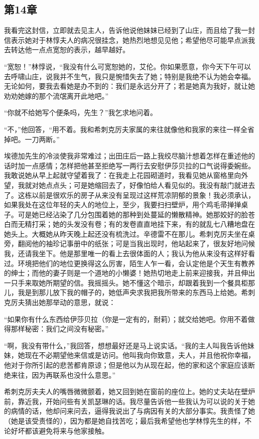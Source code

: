 \subsection{第14章}

\par 我看完这封信，立即就去见主人，告诉他说他妹妹已经到了山庄，而且给了我一封信表示她对于林惇夫人的病况很挂念，她热烈地想见见他；希望他尽可能早点派我去转达他一点点宽恕的表示，越早越好。
\par “宽恕！”林惇说，“我没有什么可宽恕她的，艾伦。你如果愿意，你今天下午可以去呼啸山庄，说我并不生气，我只是惋惜失去了她；特别是我绝不认为她会幸福。无论如何，要我去看她是办不到的：我们是永远分开了；若是她真为我好，就让她劝劝她嫁的那个流氓离开此地吧。”
\par “你就不给她写个便条吗，先生？”我乞求地问着。
\par “不，”他回答，“用不着。我和希刺克厉夫家属的来往就像他和我家的来往一样全省掉吧。一刀两断。”
\par 埃德加先生的冷淡使我非常难过；出田庄后一路上我绞尽脑汁想着怎样在重述他的话时加一点感情；怎样把他甚至拒绝写一两行去安慰伊莎贝拉的口气说得委婉些。我敢说她从早上起就守望着我了：在我走上花园砌道时，我看见她从窗格里向外望，我就对她点点头；可是她缩回去了，好像怕给人看见似的。我没有敲门就进去了。这栋以前是很欢乐的房子从来没有呈现过这样荒凉阴郁的景象！我必须承认，如果我处在这位年轻的夫人的地位上，至少，我要扫扫壁炉，用个鸡毛帚掸掸桌子。可是她已经沾染了几分包围着她的那种到处蔓延的懒散精神。她那姣好的脸苍白而无精打采；她的头发没有卷；有的发卷直直地挂下来，有的就乱七八糟地盘在她头上。大概她从昨天晚上起还没有梳洗过。辛德雷不在那儿。希刺克厉夫坐在桌旁，翻阅他的袖珍记事册中的纸张；可是当我出现时，他站起来了，很友好地问候我，还请我坐下。他是那里唯一的看上去很体面的人；我认为他从来没有这样好看过。环境把他们的地位更换得这么厉害，陌生人乍一看，会认定他是个天生有教养的绅士；而他的妻子则是一个道地的小懒婆！她热切地走上前来迎接我，并且伸出一只手来取她所期望的信。我摇摇头。她不懂这个暗示，却跟着我到一个餐具柜那儿，我是到那儿放下我的帽子的，她低声央求我把我所带来的东西马上给她。希刺克厉夫猜出她那举动的意思，就说：
\par “如果你有什么东西给伊莎贝拉（你是一定有的，耐莉）；就交给她吧。你用不着做得那样秘密：我们之间没有秘密。”
\par “啊，我没有带什么，”我回答，想想最好还是马上说实话。“我的主人叫我告诉他妹妹，她现在不必期望他来信或是访问。他叫我向你致意，夫人，并且他祝你幸福，他对于你所引起的悲苦都肯原谅；但是他以为从现在起，他的家和这个家庭应该断绝来往，因为再联系也没什么意思。”
\par 希刺克厉夫夫人的嘴唇微微颤着，她又回到她在窗前的座位上。她的丈夫站在壁炉前，靠近我，开始问些有关凯瑟琳的话。我尽量告诉他一些我认为可以说的关于她的病情的话，他却问来问去，逼得我说出了与病因有关的大部分事实。我责怪了她（她是该受责怪的），因为都是她自找苦吃；最后我希望他也学林惇先生的样，不论好坏都该避免将来与他家接触。
